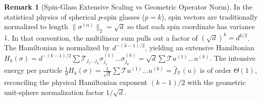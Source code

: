 \documentclass[11pt,a4paper,reqno]{amsart}
\theoremstyle{definition}
\newtheorem{remark}[theorem]{Remark}
\numberwithin{equation}{section}
\begin{document}
\begin{remark}[Spin-Glass Extensive Scaling vs Geometric Operator Norm]
In the statistical physics of spherical $p$-spin glasses ($p = k$), spin vectors are traditionally normalized to length $\|\sigma^{(\alpha)}\|_2 = \sqrt{d}$ so that each spin coordinate has variance $1$. In that convention, the multilinear sum pulls out a factor of $(\sqrt{d})^k = d^{k/2}$. The Hamiltonian is normalized by $d^{-(k-1)/2}$, yielding an extensive Hamiltonian $H_k(\sigma) = d^{-(k-1)/2} \sum \mathcal{T}_{j_1 \dots j_k} \sigma_{j_1}^{(1)} \dots \sigma_{j_k}^{(k)} = \sqrt{d} \sum \mathcal{T} u^{(1)} \dots u^{(k)}$. The intensive energy per particle $\frac{1}{d} H_k(\sigma) = \frac{1}{\sqrt{d}} \sum \mathcal{T} u^{(1)} \dots u^{(k)} = \widehat{f}_{\mathcal{T}}(u)$ is of order $\Theta(1)$, reconciling the physical Hamiltonian exponent $(k-1)/2$ with the geometric unit-sphere normalization factor $1/\sqrt{d}$.
\end{remark}
\end{document}
